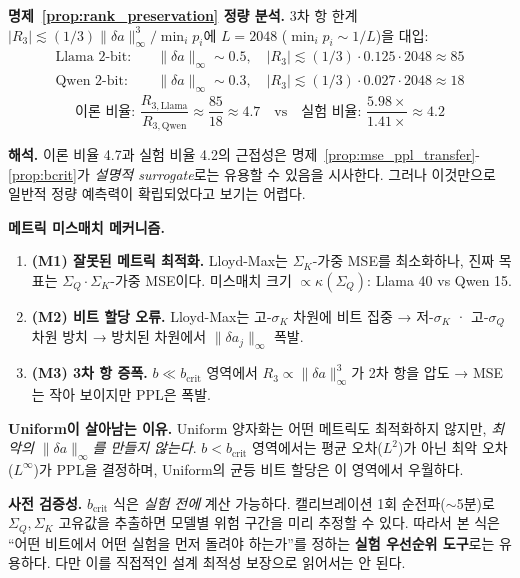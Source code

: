 \textbf{명제~\ref{prop:rank_preservation} 정량 분석.} 3차 항 한계 $|R_3| \lesssim (1/3) \lVert \delta a \rVert_\infty^3 / \min_i p_i$에 $L = 2048$ ($\min_i p_i \sim 1/L$)을 대입:
\begin{align*}
\text{Llama 2-bit:}\quad & \lVert \delta a \rVert_\infty \sim 0.5,\quad |R_3| \lesssim (1/3) \cdot 0.125 \cdot 2048 \approx 85 \\
\text{Qwen 2-bit:}\quad  & \lVert \delta a \rVert_\infty \sim 0.3,\quad |R_3| \lesssim (1/3) \cdot 0.027 \cdot 2048 \approx 18
\end{align*}
\begin{equation*}
\text{이론 비율: } \frac{R_{3,\text{Llama}}}{R_{3,\text{Qwen}}} \approx \frac{85}{18} \approx 4.7 \quad\text{vs}\quad \text{실험 비율: } \frac{5.98\times}{1.41\times} \approx 4.2
\end{equation*}

\textbf{해석.} 이론 비율 4.7과 실험 비율 4.2의 근접성은 명제~\ref{prop:mse_ppl_transfer}-\ref{prop:bcrit}가 \emph{설명적 surrogate}로는 유용할 수 있음을 시사한다. 그러나 이것만으로 일반적 정량 예측력이 확립되었다고 보기는 어렵다.

\textbf{메트릭 미스매치 메커니즘.}
\begin{enumerate}[leftmargin=1.5em,itemsep=2pt]
\item \textbf{(M1) 잘못된 메트릭 최적화.} Lloyd-Max는 $\Sigma_K$-가중 MSE를 최소화하나, 진짜 목표는 $\Sigma_Q \cdot \Sigma_K$-가중 MSE이다. 미스매치 크기 $\propto \kappa(\Sigma_Q)$: Llama 40 vs Qwen 15.
\item \textbf{(M2) 비트 할당 오류.} Lloyd-Max는 고-$\sigma_K$ 차원에 비트 집중 → 저-$\sigma_K$ · 고-$\sigma_Q$ 차원 방치 → 방치된 차원에서 $\lVert \delta a_j \rVert_\infty$ 폭발.
\item \textbf{(M3) 3차 항 증폭.} $b \ll b_{\mathrm{crit}}$ 영역에서 $R_3 \propto \lVert \delta a \rVert_\infty^3$가 2차 항을 압도 → MSE는 작아 보이지만 PPL은 폭발.
\end{enumerate}

\textbf{Uniform이 살아남는 이유.} Uniform 양자화는 어떤 메트릭도 최적화하지 않지만, \emph{최악의 $\lVert \delta a \rVert_\infty$를 만들지 않는다}. $b < b_{\mathrm{crit}}$ 영역에서는 평균 오차($L^2$)가 아닌 최악 오차($L^\infty$)가 PPL을 결정하며, Uniform의 균등 비트 할당은 이 영역에서 우월하다.

\textbf{사전 검증성.} $b_{\mathrm{crit}}$ 식은 \emph{실험 전에} 계산 가능하다. 캘리브레이션 1회 순전파($\sim$5분)로 $\Sigma_Q, \Sigma_K$ 고유값을 추출하면 모델별 위험 구간을 미리 추정할 수 있다. 따라서 본 식은 ``어떤 비트에서 어떤 실험을 먼저 돌려야 하는가''를 정하는 \textbf{실험 우선순위 도구}로는 유용하다. 다만 이를 직접적인 설계 최적성 보장으로 읽어서는 안 된다.
